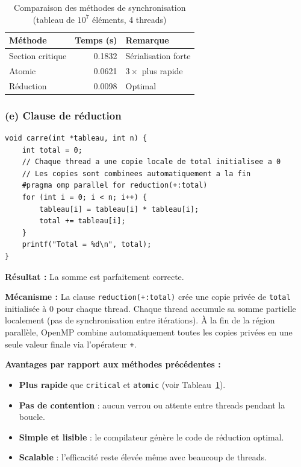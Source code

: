 \documentclass[12pt, a4paper]{article}
\begin{document}
\begin{table}[h!]
    \centering
    \caption{Comparaison des méthodes de synchronisation (tableau de $10^7$ éléments, 4 threads)}
    \label{tab:C6_sync}
    \begin{tabular}{lrl}
        \toprule
        \textbf{Méthode} & \textbf{Temps (s)} & \textbf{Remarque} \\
        \midrule
        Section critique  & 0.1832 & Sérialisation forte \\
        Atomic            & 0.0621 & $3\times$ plus rapide \\
        Réduction       & 0.0098 & Optimal \\
        \bottomrule
    \end{tabular}
\end{table}

\subsubsection{(e) Clause de réduction}

\begin{lstlisting}[caption={partiC\_6e.c -- Clause de réduction}, label={lst:C6e}]
void carre(int *tableau, int n) {
    int total = 0;
    // Chaque thread a une copie locale de total initialisee a 0
    // Les copies sont combinees automatiquement a la fin
    #pragma omp parallel for reduction(+:total)
    for (int i = 0; i < n; i++) {
        tableau[i] = tableau[i] * tableau[i];
        total += tableau[i];
    }
    printf("Total = %d\n", total);
}
\end{lstlisting}

\textbf{Résultat :} La somme est parfaitement correcte.

\textbf{Mécanisme :} La clause \texttt{reduction(+:total)} crée une copie privée de \texttt{total}
initialisée \`a $0$ pour chaque thread. Chaque thread accumule sa somme partielle localement (pas de
synchronisation entre itérations). \`A la fin de la région parallèle, OpenMP combine automatiquement
toutes les copies privées en une seule valeur finale via l'opérateur \texttt{+}.

\textbf{Avantages par rapport aux méthodes précédentes :}
\begin{itemize}
    \item \textbf{Plus rapide} que \texttt{critical} et \texttt{atomic} (voir Tableau~\ref{tab:C6_sync}).
    \item \textbf{Pas de contention} : aucun verrou ou attente entre threads pendant la boucle.
    \item \textbf{Simple et lisible} : le compilateur génère le code de réduction optimal.
    \item \textbf{Scalable} : l'efficacité reste élevée m\^eme avec beaucoup de threads.
\end{itemize}
\end{document}
